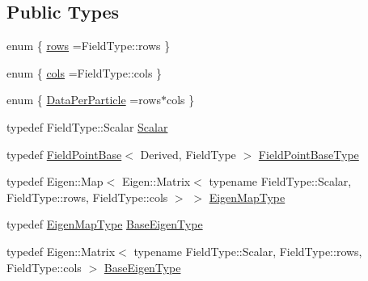 \subsection*{Public Types}
\begin{DoxyCompactItemize}
\item 
enum \{ \hyperlink{structmodel_1_1_field_point_base_a1d9fdd2d53d3c5ddead347874493d855af0f958d8d671d90e3ea2c2fddc6644c2}{rows} =Field\+Type\+:\+:rows
 \}
\item 
enum \{ \hyperlink{structmodel_1_1_field_point_base_a6dc42dcaa11e9bcb461705d8607fe5f3ab2ce121c0ae74586411dfdb458970a9c}{cols} =Field\+Type\+:\+:cols
 \}
\item 
enum \{ \hyperlink{structmodel_1_1_field_point_base_a3f3c342d2feb97b57e43f850c5be8775af5e1d6c4fcb680281df730d990a70888}{Data\+Per\+Particle} =rows$\ast$cols
 \}
\item 
typedef Field\+Type\+::\+Scalar \hyperlink{structmodel_1_1_field_point_base_a3dda233ae4c7db5b714a8a3f25486dde}{Scalar}
\item 
typedef \hyperlink{structmodel_1_1_field_point_base}{Field\+Point\+Base}$<$ Derived, Field\+Type $>$ \hyperlink{structmodel_1_1_field_point_base_af0913f98b672e5e02c75754aed6e0355}{Field\+Point\+Base\+Type}
\item 
typedef Eigen\+::\+Map$<$ Eigen\+::\+Matrix$<$ typename Field\+Type\+::\+Scalar, Field\+Type\+::rows, Field\+Type\+::cols $>$ $>$ \hyperlink{structmodel_1_1_field_point_base_a595d9a8b475233f7197b3ad3659df94e}{Eigen\+Map\+Type}
\item 
typedef \hyperlink{structmodel_1_1_field_point_base_a595d9a8b475233f7197b3ad3659df94e}{Eigen\+Map\+Type} \hyperlink{structmodel_1_1_field_point_base_a40049730fe4abdfa3cff40d66f7d4ce5}{Base\+Eigen\+Type}
\item 
typedef Eigen\+::\+Matrix$<$ typename Field\+Type\+::\+Scalar, Field\+Type\+::rows, Field\+Type\+::cols $>$ \hyperlink{structmodel_1_1_field_point_base_aa9d600abaa521d1bbc6357203da99dde}{Base\+Eigen\+Type}
\end{DoxyCompactItemize}
